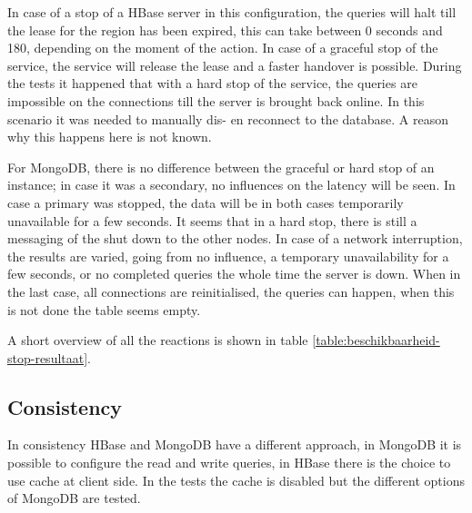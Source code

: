 \documentclass[final,5p,times]{elsarticle}
\begin{document}
In case of a stop of a HBase server in this configuration, the queries will halt till the lease for the region has been expired, this can take between 0 seconds and 180, depending on the moment of the action. In case of a graceful stop of the service, the service will release the lease and a faster handover is possible. During the tests it happened that with a hard stop of the service, the queries are impossible on the connections till the server is brought back online. In this scenario it was needed to manually dis- en reconnect to the database. A reason why this happens here is not known. 

For MongoDB, there is no difference between the graceful or hard stop of an instance; in case it was a secondary, no influences on the latency will be seen. In case a primary was stopped, the data will be in both cases temporarily unavailable for a few seconds. It seems that in a hard stop, there is still a messaging of the shut down to the other nodes. In case of a network interruption, the results are varied, going from no influence, a temporary unavailability for a few seconds, or no completed queries the whole time the server is down. When in the last case, all connections are reinitialised, the queries can happen, when this is not done the table seems empty. 

A short overview of all the reactions is shown in table \ref{table:beschikbaarheid-stop-resultaat}. 
\begin{table}[htbp]
  \centering
    \caption{Availability: Overview of different reaction when stopping an instance }
  \label{table:beschikbaarheid-stop-resultaat}%
\end{table}

\subsection{Consistency}
In consistency HBase and MongoDB have a different approach, in MongoDB it is possible to configure the read and write queries, in HBase there is the choice to use cache at client side. In the tests the cache is disabled but the different options of MongoDB are tested. 
\end{document}

